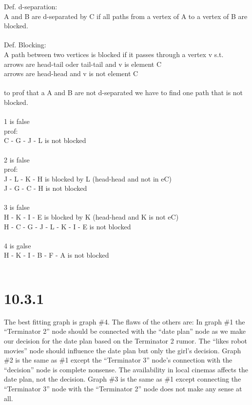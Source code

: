 \documentclass[a4paper,11pt]{article}
\theoremstyle{definition}
\theoremstyle{plain}
\theoremstyle{remark}
\begin{document}
Def. d-separation:\\
A and B are d-separated by C if all paths from a vertex of A to a vertex of B are blocked.\\
\\
Def. Blocking:\\
A path between two vertices is blocked if it passes through a vertex v s.t.\\
      arrows are head-tail oder tail-tail and v is element C\\
      arrows are head-head and v is not element C\\
\\
to prof that a A and B are not d-separated we have to find one path that is not blocked.\\
\\
1 is false\\
prof: \\
C - G - J - L is not blocked\\
\\
2 is false\\
prof: \\
J - L - K - H is blocked by L (head-head and not in eC)\\
J - G - C - H is not blocked\\
\\
3 is false\\
H - K - I - E is blocked by K (head-head and K is not eC)\\
H - C - G - J - L - K - I - E is not blocked\\
\\
4 is galse\\
H - K - I - B - F - A is not blocked\\
\\
\section*{10.3.1}
The best fitting graph is graph \#4. The flaws of the others are:
In graph \#1 the ``Terminator 2'' node should be connected with the ``date plan'' node as we make our decision for the date plan based on the Terminator 2 rumor. The ``likes robot movies'' node should influence the date plan but only the girl's decision. Graph \#2 is the same as \#1 except the ``Terminator 3'' node's connection with the ``decision'' node is complete nonsense. The availability in local cinemas affects the date plan, not the decision. Graph \#3 is the same as \#1 except connecting the ``Terminator 3'' node with the ``Terminator 2'' node does not make any sense at all.
\end{document}
